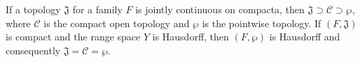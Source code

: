 If a topology $\mathfrak{J}$ for a family $F$ is jointly continuous on compacta, then $\mathfrak{J} \supset \mathcal{C} \supset \wp$, where $\mathcal{C}$ is the compact open topology and $\wp$ is the pointwise topology. If $(F,\mathfrak{J})$ is compact and the range space $Y$ is Hausdorff, then $(F,\wp)$ is Hausdorff and consequently $\mathfrak{J} = \mathcal{C} = \wp$.
